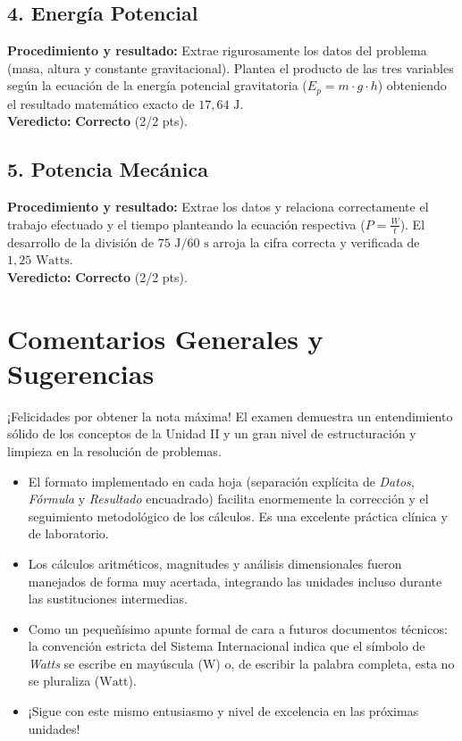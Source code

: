 \documentclass[12pt,letterpaper]{article}
\begin{document}
\subsection*{4. Energía Potencial}
\textbf{Procedimiento y resultado:} Extrae rigurosamente los datos del problema (masa, altura y constante gravitacional). Plantea el producto de las tres variables según la ecuación de la energía potencial gravitatoria ($E_p = m \cdot g \cdot h$) obteniendo el resultado matemático exacto de $17,64 \text{ J}$. \\
\textbf{Veredicto:} \textbf{Correcto} (2/2 pts).

\subsection*{5. Potencia Mecánica}
\textbf{Procedimiento y resultado:} Extrae los datos y relaciona correctamente el trabajo efectuado y el tiempo planteando la ecuación respectiva ($P = \frac{W}{t}$). El desarrollo de la división de $75 \text{ J} / 60 \text{ s}$ arroja la cifra correcta y verificada de $1,25 \text{ Watts}$. \\
\textbf{Veredicto:} \textbf{Correcto} (2/2 pts).

\vspace{0.5cm}
\section*{Comentarios Generales y Sugerencias}
¡Felicidades por obtener la nota máxima! El examen demuestra un entendimiento sólido de los conceptos de la Unidad II y un gran nivel de estructuración y limpieza en la resolución de problemas.
\begin{itemize}
    \item El formato implementado en cada hoja (separación explícita de \textit{Datos}, \textit{Fórmula} y \textit{Resultado} encuadrado) facilita enormemente la corrección y el seguimiento metodológico de los cálculos. Es una excelente práctica clínica y de laboratorio.
    \item Los cálculos aritméticos, magnitudes y análisis dimensionales fueron manejados de forma muy acertada, integrando las unidades incluso durante las sustituciones intermedias.
    \item Como un pequeñísimo apunte formal de cara a futuros documentos técnicos: la convención estricta del Sistema Internacional indica que el símbolo de \textit{Watts} se escribe en mayúscula ($\text{W}$) o, de escribir la palabra completa, esta no se pluraliza ($\text{Watt}$).
    \item ¡Sigue con este mismo entusiasmo y nivel de excelencia en las próximas unidades!
\end{itemize}
\end{document}
